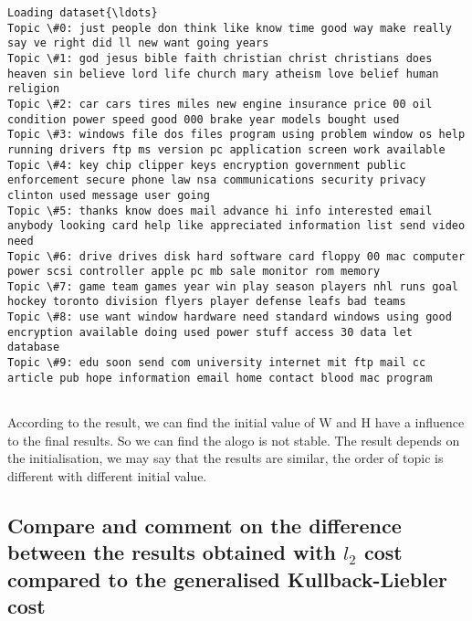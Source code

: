 \documentclass[11pt]{article}
\begin{document}
    \begin{Verbatim}[commandchars=\\\{\}]
Loading dataset{\ldots}
Topic \#0: just people don think like know time good way make really say ve right did ll new want going years
Topic \#1: god jesus bible faith christian christ christians does heaven sin believe lord life church mary atheism love belief human religion
Topic \#2: car cars tires miles new engine insurance price 00 oil condition power speed good 000 brake year models bought used
Topic \#3: windows file dos files program using problem window os help running drivers ftp ms version pc application screen work available
Topic \#4: key chip clipper keys encryption government public enforcement secure phone law nsa communications security privacy clinton used message user going
Topic \#5: thanks know does mail advance hi info interested email anybody looking card help like appreciated information list send video need
Topic \#6: drive drives disk hard software card floppy 00 mac computer power scsi controller apple pc mb sale monitor rom memory
Topic \#7: game team games year win play season players nhl runs goal hockey toronto division flyers player defense leafs bad teams
Topic \#8: use want window hardware need standard windows using good encryption available doing used power stuff access 30 data let database
Topic \#9: edu soon send com university internet mit ftp mail cc article pub hope information email home contact blood mac program


    \end{Verbatim}

    According to the result, we can find the initial value of W and H have a
influence to the final results. So we can find the alogo is not stable.
The result depends on the initialisation, we may say that the results
are similar, the order of topic is different with different initial
value.

    \subsection{\texorpdfstring{Compare and comment on the difference
between the results obtained with \(l_2\) cost compared to the
generalised Kullback-Liebler
cost}{Compare and comment on the difference between the results obtained with l\_2 cost compared to the generalised Kullback-Liebler cost}}\label{compare-and-comment-on-the-difference-between-the-results-obtained-with-l_2-cost-compared-to-the-generalised-kullback-liebler-cost}
\end{document}
